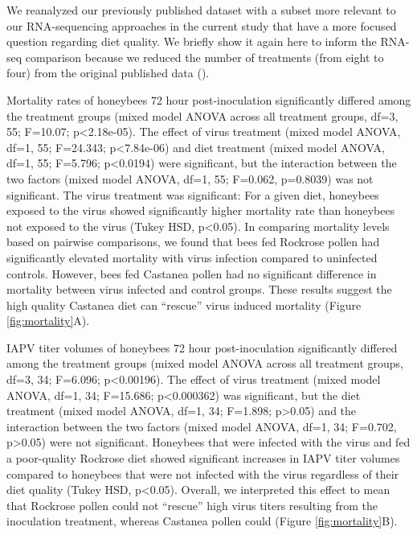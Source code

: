 \documentclass[11pt,a4paper,oldfontcommands,openany]{memoir}
\numberwithin{equation}{section} %
\begin{document}
We reanalyzed our previously published dataset with a subset more relevant to our RNA-sequencing approaches in the current study that have a more focused question regarding diet quality. We briefly show it again here to inform the RNA-seq comparison because we reduced the number of treatments (from eight to four) from the original published data (\citealt{adamInt}).

Mortality rates of honeybees 72 hour post-inoculation significantly differed among the treatment groups (mixed model ANOVA across all treatment groups, df=3, 55; F=10.07; p<2.18e-05). The effect of virus treatment (mixed model ANOVA, df=1, 55; F=24.343; p<7.84e-06) and diet treatment (mixed model ANOVA, df=1, 55; F=5.796; p<0.0194) were significant, but the interaction between the two factors (mixed model ANOVA, df=1, 55; F=0.062, p=0.8039) was not significant. The virus treatment was significant: For a given diet, honeybees exposed to the virus showed significantly higher mortality rate than honeybees not exposed to the virus (Tukey HSD, p<0.05). In comparing mortality levels based on pairwise comparisons, we found that bees fed Rockrose pollen had significantly elevated mortality with virus infection compared to uninfected controls. However, bees fed Castanea pollen had no significant difference in mortality between virus infected and control groups. These results suggest the high quality Castanea diet can ``rescue'' virus induced mortality (Figure \ref{fig:mortality}A).

IAPV titer volumes of honeybees 72 hour post-inoculation significantly differed among the treatment groups (mixed model ANOVA across all treatment groups, df=3, 34; F=6.096; p<0.00196). The effect of virus treatment (mixed model ANOVA, df=1, 34; F=15.686; p<0.000362) was significant, but the diet treatment (mixed model ANOVA, df=1, 34; F=1.898; p>0.05) and the interaction between the two factors (mixed model ANOVA, df=1, 34; F=0.702, p>0.05) were not significant. Honeybees that were infected with the virus and fed a poor-quality Rockrose diet showed significant increases in IAPV titer volumes compared to honeybees that were not infected with the virus regardless of their diet quality (Tukey HSD, p<0.05). Overall, we interpreted this effect to mean that Rockrose pollen could not ``rescue'' high virus titers resulting from the inoculation treatment, whereas Castanea pollen could (Figure \ref{fig:mortality}B).
\end{document}
